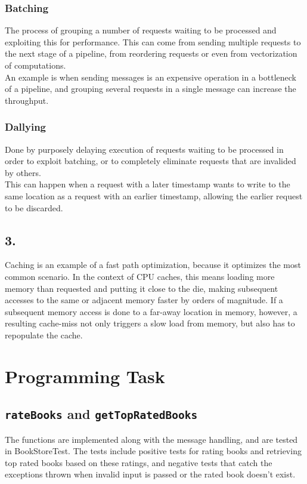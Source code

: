 \documentclass[12pt]{article}
\begin{document}
\subsubsection*{Batching}
The process of grouping a number of requests waiting to be processed and exploiting this for performance. This can come from sending multiple requests to the next stage of a pipeline, from reordering requests or even from vectorization of computations. \\
An example is when sending messages is an expensive operation in a bottleneck of a pipeline, and grouping several requests in a single message can increase the throughput.

\subsubsection*{Dallying}
Done by purposely delaying execution of requests waiting to be processed in order to exploit batching, or to completely eliminate requests that are invalided by others. \\
This can happen when a request with a later timestamp wants to write to the same location as a request with an earlier timestamp, allowing the earlier request to be discarded.

\subsection*{3.} %

Caching is an example of a fast path optimization, because it optimizes the most common scenario. In the context of CPU caches, this means loading more memory than requested and putting it close to the die, making subsequent accesses to the same or adjacent memory faster by orders of magnitude. If a subsequent memory access is done to a far-away location in memory, however, a resulting cache-miss not only triggers a slow load from memory, but also has to repopulate the cache.

\section*{Programming Task}

\subsection*{\texttt{rateBooks} and \texttt{getTopRatedBooks}}

The functions are implemented along with the message handling, and are tested in BookStoreTest. The tests include positive tests for rating books and retrieving top rated books based on these ratings, and negative tests that catch the exceptions thrown when invalid input is passed or the rated book doesn't exist.
\end{document}
